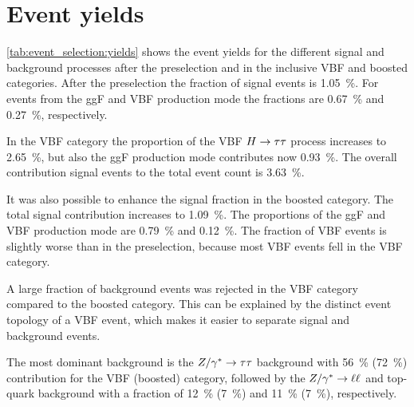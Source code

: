 \section{Event yields}\label{sec:event_selection:yields}

\cref{tab:event_selection:yields} shows the event yields for the different signal and background processes after
the preselection and in the inclusive VBF and boosted categories.
After the preselection the fraction of signal events is \SI{1.05}{\percent}.
For events from the ggF and VBF production mode the fractions are \SI{0.67}{\percent} and \SI{0.27}{\percent}, respectively.

In the VBF category the proportion of the VBF $H \to \tau \tau$ process increases to \SI{2.65}{\percent}, but also the ggF production mode
contributes now \SI{0.93}{\percent}.
The overall contribution signal events to the total event count is \SI{3.63}{\percent}.

It was also possible to enhance the signal fraction in the boosted category.
The total signal contribution increases to \SI{1.09}{\percent}.
The proportions of the ggF and VBF production mode are \SI{0.79}{\percent} and \SI{0.12}{\percent}.
The fraction of VBF events is slightly worse than in the preselection, because most VBF events fell in the VBF category.

A large fraction of background events was rejected in the VBF category compared to the boosted category.
This can be explained by the distinct event topology of a VBF event, which makes it easier to separate signal and background events.

The most dominant background is the $Z / \gamma^* \to \tau \tau$ background with \SI{56}{\percent} (\SI{72}{\percent}) contribution for the
VBF (boosted) category, followed by the
$Z / \gamma^* \to \ell \ell$ and top-quark background with a fraction of \SI{12}{\percent} (\SI{7}{\percent}) and \SI{11}{\percent} (\SI{7}{\percent}), respectively.

